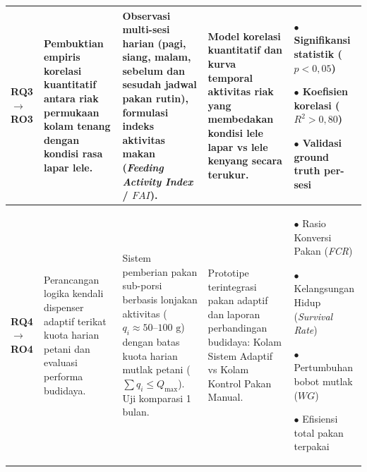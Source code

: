 \documentclass[10pt,a4paper]{article}
\providecommand{\text}[1]{\mbox{#1}}
\begin{document}
\begin{table}[h!]
\begin{tabular}{|p{1.4cm}|p{6.0cm}|p{6.3cm}|p{6.2cm}|p{5.4cm}|}
\textbf{RQ3 $\rightarrow$ RO3} & 
Pembuktian empiris korelasi kuantitatif antara riak permukaan kolam tenang dengan kondisi rasa lapar lele. & 
Observasi multi-sesi harian (pagi, siang, malam, sebelum dan sesudah jadwal pakan rutin), formulasi indeks aktivitas makan (\textit{Feeding Activity Index} / $FAI$). & 
Model korelasi kuantitatif dan kurva temporal aktivitas riak yang membedakan kondisi lele lapar vs lele kenyang secara terukur. & 
$\bullet$ Signifikansi statistik ($p < 0,05$)\par
$\bullet$ Koefisien korelasi ($R^2 > 0,80$)\par
$\bullet$ Validasi ground truth per-sesi \\
\hline

\textbf{RQ4 $\rightarrow$ RO4} & 
Perancangan logika kendali dispenser adaptif terikat kuota harian petani dan evaluasi performa budidaya. & 
Sistem pemberian pakan sub-porsi berbasis lonjakan aktivitas ($q_i \approx 50\text{--}100\text{ g}$) dengan batas kuota harian mutlak petani ($\sum q_i \le Q_{\max}$). Uji komparasi 1 bulan. & 
Prototipe terintegrasi pakan adaptif dan laporan perbandingan budidaya: Kolam Sistem Adaptif vs Kolam Kontrol Pakan Manual. & 
$\bullet$ Rasio Konversi Pakan (\textit{FCR})\par
$\bullet$ Kelangsungan Hidup (\textit{Survival Rate})\par
$\bullet$ Pertumbuhan bobot mutlak ($WG$)\par
$\bullet$ Efisiensi total pakan terpakai \\
\hline
\end{tabular}
\end{table}

\vspace{-0.1cm}
\end{document}
